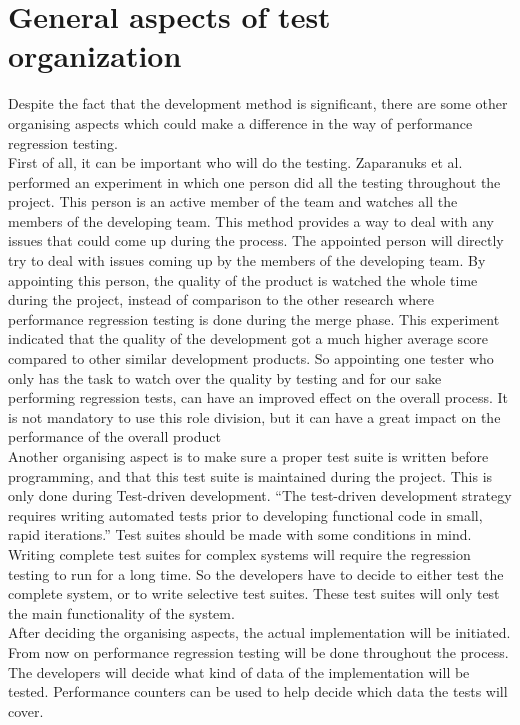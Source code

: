 \section{General aspects of test organization}
Despite the fact that the development method is significant, there are some other organising aspects which could make a difference in the way of performance regression testing. \\
First of all, it can be important who will do the testing. Zaparanuks et al. performed an experiment in which one person did all the testing throughout the project. \cite{sutherland2009fully} This person is an active member of the team and watches all the members of the developing team. This method provides a way to deal with any issues that could come up during the process. The appointed person will directly try to deal with issues coming up by the members of the developing team. By appointing this person, the quality of the product is watched the whole time during the project, instead of comparison to the other research where performance regression testing is done during the merge phase. This experiment indicated that the quality of the development got a much higher average score compared to other similar development products. So appointing one tester who only has the task to watch over the quality by testing and for our sake performing regression tests, can have an improved effect on the overall process. It is not mandatory to use this role division, but it can have a great impact on the performance of the overall product \\

Another organising aspect is to make sure a proper test suite is written before programming, and that this test suite is maintained during the project. This is only done during Test-driven development. ``The test-driven development strategy
requires writing automated tests prior to
developing functional code in small, rapid
iterations.'' \cite{astels2003test} Test suites should be made with some conditions in mind. Writing complete test suites for complex systems will require the regression testing to run for a long time. \cite{rothermel2001prioritizing} So the developers have to decide to either test the complete system, or to write selective test suites. These test suites will only test the main functionality of the system. \\
After deciding the organising aspects, the actual implementation will be initiated. From now on performance regression testing will be done throughout the process. The developers will decide what kind of data of the implementation will be tested. Performance counters can be used to help decide which data the tests will cover.
